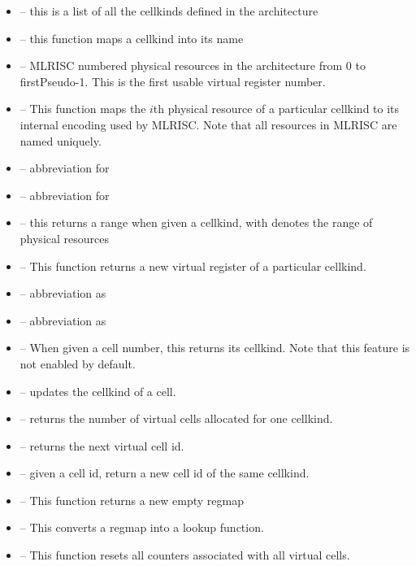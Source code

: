 \begin{itemize}
  \item{} -- this is a list of all the cellkinds defined in the
architecture
  \item{} -- this function maps a cellkind into its name
  \item{} -- MLRISC numbered physical resources
   in the architecture from 0 to firstPseudo-1.  
   This is the first usable virtual register number.
  \item{} -- This function maps the $i$th physical
   resource of a particular cellkind to its internal encoding used by MLRISC.
   Note that all resources in MLRISC are named uniquely.
  \item{} -- abbreviation for  
  \item{} -- abbreviation for  
  \item {} -- this returns a range 
   when given a cellkind, with denotes the range of physical resources
  \item {}  -- This function returns a new virtual register 
   of a particular cellkind.
  \item {} -- abbreviation as 
  \item {} -- abbreviation as 
  \item {}  -- When given a cell number, this returns its
    cellkind.  Note that this feature is not enabled by default.
  \item {} -- updates the cellkind of a cell.
  \item {} -- returns the number of virtual cells allocated for one cellkind.
  \item {} --  returns the next virtual cell id.
  \item {}  -- given a cell id, return a new cell id of
     the same cellkind.
  \item {} -- This function returns a new empty regmap
  \item {} -- This converts a regmap into a lookup function.
  \item {} -- This function resets all counters associated
with all virtual cells.
\end{itemize}

